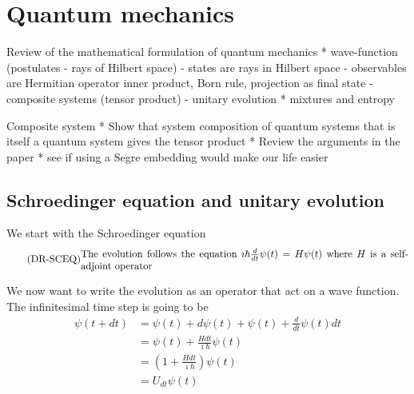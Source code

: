 

\def\>{\rangle}
\def\<{\langle}


\chapter{Quantum mechanics}


Review of the mathematical formulation of quantum mechanics
* wave-function (postulates - rays of Hilbert space)
- states are rays in Hilbert space
- observables are Hermitian operator inner product, Born rule, projection as final state
- composite systems (tensor product)
- unitary evolution
* mixtures and entropy

Composite system
* Show that system composition of quantum systems that is itself a quantum system gives the tensor product
* Review the arguments in the paper
* see if using a Segre embedding would make our life easier

\section{Schroedinger equation and unitary evolution}

We start with the Schroedinger equation
\begin{equation}\label{rp-qm-uev-condSchroedingerEq}
	\tag{DR-SCEQ}
	\eqtext{The evolution follows the equation $\imath \hbar \frac{d}{dt} \psi(t) = H \psi(t)$ where $H$ is a self-adjoint operator}
\end{equation}

We now want to write the evolution as an operator that act on a wave function. The infinitesimal time step is going to be
\begin{equation}
	\begin{aligned}
		\psi(t+dt) &= \psi(t) + d\psi(t) + \psi(t) + \frac{d}{dt} \psi(t) dt \\
		&= \psi(t)+ \frac{H dt}{\imath \hbar} \psi(t)\\
		&= \left(1 + \frac{H dt}{\imath \hbar}\right)\psi(t) \\
		&= U_{dt}\psi(t)
	\end{aligned}
\end{equation}

